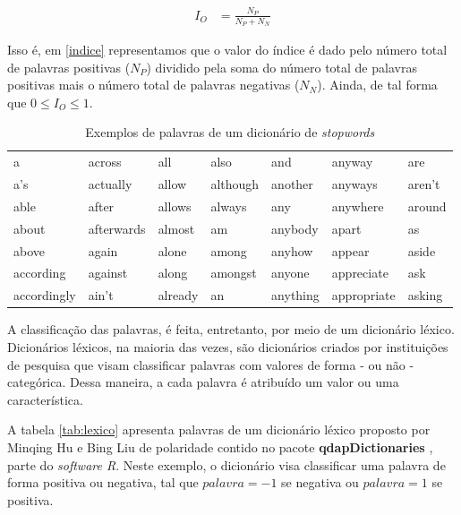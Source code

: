 \begin{align} \label{indice} 
    I_O &= \frac{N_P}{N_P + N_N}
\end{align}

Isso é, em \ref{indice} representamos que o valor do índice é dado pelo número total de palavras positivas ($N_P$) dividido pela soma do número total de palavras positivas mais o número total de palavras negativas ($N_N$). Ainda, de tal forma que $0 \leq I_O \leq 1$.  
\begin{table}[!h]
\centering
\caption{Exemplos de palavras de um dicionário de \textit{stopwords}}
\begin{tabular}{lllllll}
  \hline
 a & across & all & also & and & anyway & are \\ 
 a's & actually & allow & although & another & anyways & aren't \\ 
 able & after & allows & always & any & anywhere & around \\ 
 about & afterwards & almost & am & anybody & apart & as \\ 
 above & again & alone & among & anyhow & appear & aside \\ 
 according & against & along & amongst & anyone & appreciate & ask \\ 
 accordingly & ain't & already & an & anything & appropriate & asking \\ 
   \hline
\end{tabular}
\label{tab:stopwords}
\end{table}

A classificação das palavras, é feita, entretanto, por meio de um dicionário léxico. Dicionários léxicos, na maioria das vezes, são dicionários criados por instituições de pesquisa que visam classificar palavras com valores de forma - ou não - categórica. Dessa maneira, a cada palavra é atribuído um valor ou uma característica. 

A tabela \ref{tab:lexico} apresenta palavras de um dicionário léxico proposto por Minqing Hu e Bing Liu \cite{hu2004mining} de polaridade contido no pacote \textbf{qdapDictionaries} \cite{qdapdict}, parte do \textit{software R}. Neste exemplo, o dicionário visa classificar uma palavra de forma positiva ou negativa, tal que $palavra = -1$ se negativa ou $palavra = 1$ se positiva.

